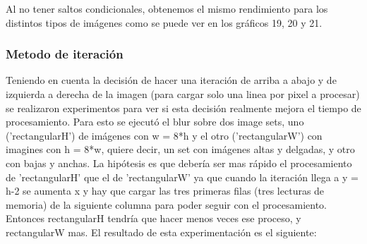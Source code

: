 \documentclass[a4paper]{article}
\begin{document}
Al no tener saltos condicionales, obtenemos el mismo rendimiento para los distintos tipos de imágenes como se puede ver en los gráficos 19, 20 y 21.

\subsubsection{Metodo de iteración}

Teniendo en cuenta la decisión de hacer una iteración de arriba a abajo y de izquierda a derecha de la imagen (para cargar solo una linea por pixel a procesar) se realizaron experimentos para ver si esta decisión realmente mejora el tiempo de procesamiento. Para esto se ejecutó el blur sobre dos image sets, uno ('rectangularH') de imágenes con w = 8*h y el otro ('rectangularW') con imagines con h = 8*w, quiere decir, un set con imágenes altas y delgadas, y otro con bajas y anchas. La hipótesis es que debería ser mas rápido el procesamiento de 'rectangularH' que el de 'rectangularW' ya que cuando la iteración llega a y = h-2 se aumenta x y hay que cargar las tres primeras filas (tres lecturas de memoria) de la siguiente columna para poder seguir con el procesamiento. Entonces rectangularH tendría que hacer menos veces ese proceso, y rectangularW mas. El resultado de esta experimentación es el siguiente:
\end{document}
